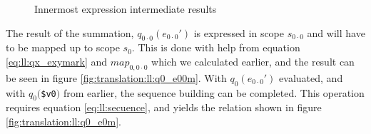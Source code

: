 \begin{figure}[!h]
\centering
{}
\caption{Innermost expression intermediate results \label{fig:translation:ll:innerExpr}}
\end{figure}

The result of the summation, $q_{0\cdot 0}(e_{0\cdot0}')$ is expressed in scope $s_{0 \cdot 0}$ and will have to
be mapped up to scope $s_{0}$. This is done with help from equation \ref{eq:ll:qx_exymark} and $map_{0, 0\cdot 0}$
which we calculated earlier, and the result can be seen in figure \ref{fig:translation:ll:q0_e00m}. With
$q_{0}(e_{0\cdot0}')$ evaluated, and with $q_{0}($\texttt{\$v0}$)$ from earlier, the sequence building can be completed. This operation requires
equation \ref{eq:ll:secuence}, and yields the relation shown in figure \ref{fig:translation:ll:q0_e0m}.

